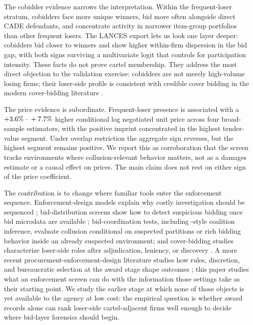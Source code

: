 The cobidder evidence narrows the interpretation. Within the
frequent-loser stratum, cobidders face more unique winners, bid
more often alongside direct CADE defendants, and concentrate
activity in narrower item-group portfolios than other frequent
losers. The LANCES export lets us look one layer deeper:
cobidders bid closer to winners and show higher within-firm
dispersion in the bid gap, with both signs surviving a
multivariate logit that controls for participation intensity.
These facts do not prove cartel membership. They address the
most direct objection to the validation exercise: cobidders are
not merely high-volume losing firms; their loser-side profile is
consistent with credible cover bidding in the modern
cover-bidding literature
\citep{asker2010leniency,marshall2012economics}.

The price evidence is subordinate. Frequent-loser presence is
associated with a $+3.6\%\,\text{--}\,+7.7\%$ higher conditional log
negotiated unit price across four broad-sample estimators, with
the positive imprint concentrated in the highest tender-value
segment. Under overlap restriction the aggregate sign reverses,
but the highest segment remains positive. We report this as
corroboration that the screen tracks environments where
collusion-relevant behavior matters, not as a damages estimate
or a causal effect on prices. The main claim does not rest on
either sign of the price coefficient.

The contribution is to change where familiar tools enter the
enforcement sequence. Enforcement-design models explain why
costly investigation should be sequenced
\citep{becker1968crime,stigler1970optimum,baker2002case,harrington2008detecting};
bid-distribution screens show how to detect suspicious bidding
once bid microdata are available
\citep{porter1993detection,bajari2003deciding,imhof2019detecting,wallimann2023machine,chassang2022robust};
bid-coordination tests, including \citet{conley2016detecting}-style
coalition inference, evaluate collusion conditional on suspected
partitions or rich bidding behavior inside an already suspected
environment; and cover-bidding studies characterize loser-side
roles after adjudication, leniency, or discovery
\citep{porter1999ohio,pesendorfer2000study,asker2010leniency}.
A more recent procurement-enforcement-design literature studies
how rules, discretion, and bureaucratic selection at the award
stage shape outcomes \citep{decarolis2014awarding,decarolis2020rules,decarolis2020bureaucratic};
this paper studies what an enforcement screen can do with the
information those settings take as their starting point. We
study the earlier stage at which none of those objects is yet
available to the agency at low cost: the empirical question is
whether award records alone can rank loser-side cartel-adjacent
firms well enough to decide where bid-layer forensics should
begin.

